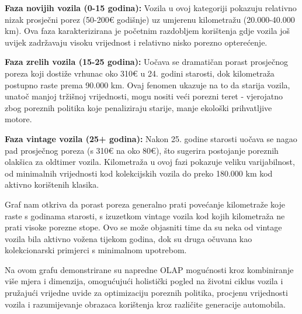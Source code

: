 \textbf{Faza novijih vozila (0-15 godina):} Vozila u ovoj kategoriji pokazuju relativno nizak prosječni porez (50-200€ godišnje) uz umjerenu kilometražu (20.000-40.000 km). Ova faza karakterizirana je početnim razdobljem korištenja gdje vozila još uvijek zadržavaju visoku vrijednost i relativno nisko porezno opterećenje.

\textbf{Faza zrelih vozila (15-25 godina):} Uočava se dramatičan porast prosječnog poreza koji dostiže vrhunac oko 310€ u 24. godini starosti, dok kilometraža postupno raste prema 90.000 km. Ovaj fenomen ukazuje na to da starija vozila, unatoč manjoj tržišnoj vrijednosti, mogu nositi veći porezni teret - vjerojatno zbog poreznih politika koje penaliziraju starije, manje ekološki prihvatljive motore.

\textbf{Faza vintage vozila (25+ godina):} Nakon 25. godine starosti uočava se nagao pad prosječnog poreza (s 310€ na oko 80€), što sugerira postojanje poreznih olakšica za oldtimer vozila. Kilometraža u ovoj fazi pokazuje veliku varijabilnost, od minimalnih vrijednosti kod kolekcijskih vozila do preko 180.000 km kod aktivno korištenih klasika.

Graf nam otkriva da porast poreza generalno prati povećanje kilometraže koje raste s godinama starosti, s izuzetkom vintage vozila kod kojih kilometraža ne prati visoke porezne stope. Ovo se može objasniti time da su neka od vintage vozila bila aktivno vožena tijekom godina, dok su druga očuvana kao kolekcionarski primjerci s minimalnom upotrebom.

Na ovom grafu demonstrirane su napredne OLAP mogućnosti kroz kombiniranje više mjera i dimenzija, omogućujući holistički pogled na životni ciklus vozila i pružajući vrijedne uvide za optimizaciju poreznih politika, procjenu vrijednosti vozila i razumijevanje obrazaca korištenja kroz različite generacije automobila.